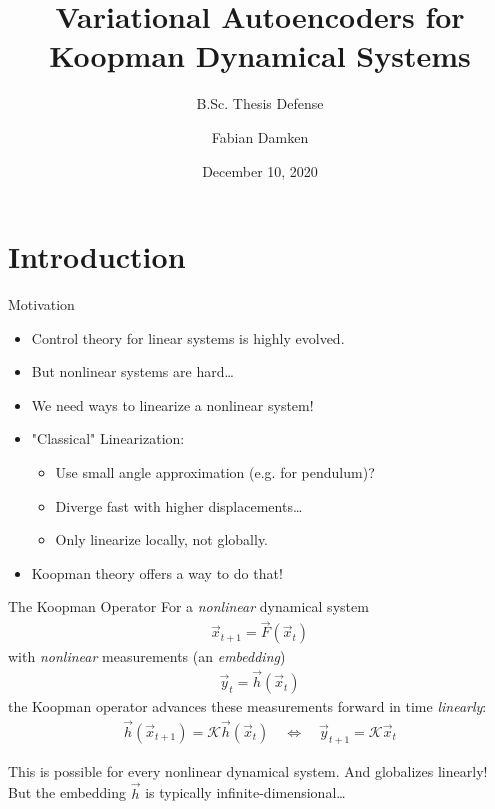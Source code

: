 \documentclass[
	aspectratio=43,
	color={accentcolor=1c},
	logo=false,
	colorframetitle=true,
]{tudabeamer}
\title{Variational Autoencoders for Koopman Dynamical Systems}
\subtitle{B.Sc. Thesis Defense}
\author{Fabian Damken}
\institute{Intelligent Autonomous Systems}
\date{December 10, 2020}
\begin{document}
	\maketitle

	\section{Introduction}
		\begin{frame}{Motivation}
			\begin{itemize}
				\item Control theory for linear systems is highly evolved.
				\item But nonlinear systems are hard\dots
				\item We need ways to linearize a nonlinear system!
				\item<2-> "Classical" Linearization:
					\begin{itemize}
						\item Use small angle approximation (e.g. for pendulum)?
						\item Diverge fast with higher displacements\dots
						\item Only linearize locally, not globally.
					\end{itemize}
				\item<3-> Koopman theory offers a way to do that!
			\end{itemize}
		\end{frame}

		\begin{frame}{The Koopman Operator}
			For a \emph{nonlinear} dynamical system
			\begin{align*}
				\vec{x}_{t + 1} = \vec{F}(\vec{x}_{t})
			\end{align*}
			with \emph{nonlinear} measurements (an \emph{embedding})
			\begin{align*}
				\vec{y}_t = \vec{h}(\vec{x}_t)
			\end{align*}
			the Koopman operator advances these measurements forward in time \emph{linearly}:
			\begin{align*}
				\vec{h}(\vec{x}_{t + 1}) = \mathcal{K} \vec{h}(\vec{x}_t)
				\quad\iff\quad
				\vec{y}_{t + 1} = \mathcal{K} \vec{x}_t
			\end{align*}

			This is possible for every nonlinear dynamical system. And globalizes linearly! But the embedding \(\vec{h}\) is typically infinite-dimensional\dots
		\end{frame}
\end{document}
